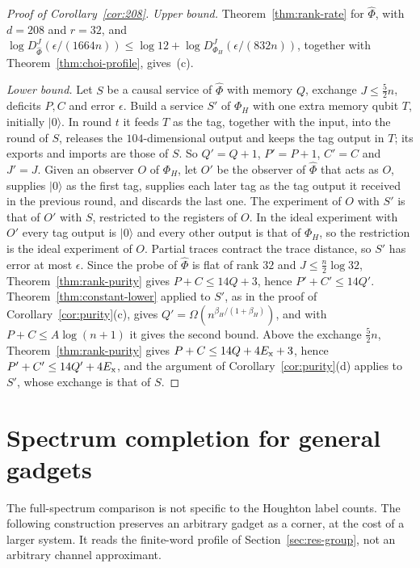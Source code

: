 \documentclass[11pt,a4paper]{article}
\theoremstyle{plain}
\theoremstyle{definition}
\theoremstyle{remark}
\newcommand{\DChoi}{D^{J}}
\begin{document}
\begin{proof}[Proof of Corollary~\ref{cor:208}]
\emph{Upper bound.} Theorem~\ref{thm:rank-rate} for $\widehat\Phi$, with $d=208$ and $r=32$, and $\log\DChoi_{\widehat\Phi}(\epsilon/(1664n))\le
\log12+\log\DChoi_{\Phi_H}(\epsilon/(832n))$, together with Theorem~\ref{thm:choi-profile}, gives~(c).

\emph{Lower bound.} Let $S$ be a causal service of $\widehat\Phi$ with memory $Q$, exchange $J\le\frac52n$, deficits $P,C$ and error $\epsilon$. Build a service $S'$ of
$\Phi_H$ with one extra memory qubit $T$, initially $|0\rangle$. In round $t$ it feeds $T$ as the tag, together with the input, into the round of $S$, releases
the $104$-dimensional output and keeps the tag output in $T$; its exports and imports are those of $S$. So $Q'=Q+1$, $P'=P+1$, $C'=C$ and $J'=J$. Given an
observer $O$ of $\Phi_H$, let $O'$ be the observer of $\widehat\Phi$ that acts as $O$, supplies $|0\rangle$ as the first tag, supplies each later tag as the tag
output it received in the previous round, and discards the last one. The experiment of $O$ with $S'$ is that of $O'$ with $S$, restricted to the registers
of $O$. In the ideal experiment with $O'$ every tag output is $|0\rangle$ and every other output is that of $\Phi_H$, so the restriction is the ideal
experiment of $O$. Partial traces contract the trace distance, so $S'$ has error at most $\epsilon$. Since the probe of $\widehat\Phi$ is flat of rank $32$ and
$J\le\frac n2\log32$, Theorem~\ref{thm:rank-purity} gives $P+C\le14Q+3$, hence $P'+C'\le14Q'$. Theorem~\ref{thm:constant-lower} applied to $S'$, as in the
proof of Corollary~\ref{cor:purity}(c), gives $Q'=\Omega(n^{\beta_H/(1+\beta_H)})$, and with $P+C\le A\log(n+1)$ it gives the second bound. Above
the exchange $\frac52n$, Theorem~\ref{thm:rank-purity} gives $P+C\le14Q+4E_{\rm x}+3$, hence $P'+C'\le14Q'+4E_{\rm x}$, and the argument of
Corollary~\ref{cor:purity}(d) applies to $S'$, whose exchange is that of $S$.
\end{proof}



\section{Spectrum completion for general gadgets}\label{sec:spectrum-completion}


The full-spectrum comparison is not specific to the Houghton label counts. The following construction preserves an arbitrary gadget
as a corner, at the cost of a larger system. It reads the finite-word profile of Section~\ref{sec:res-group}, not an arbitrary channel approximant.
\end{document}
